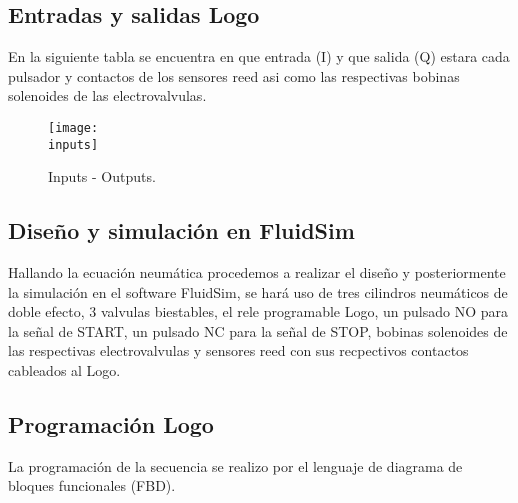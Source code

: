\documentclass[a4paper]{article}
\newcommand{\simulacion}{simulacion.pdf}
\newcommand{\program}{bloques.pdf}
\newcommand{\inputs}{images/io.png}
\begin{document}
\subsection{Entradas y salidas Logo}
En la siguiente tabla se encuentra en que entrada (I) y que salida (Q) estara cada pulsador y contactos de los sensores reed asi como las respectivas bobinas solenoides de las electrovalvulas.
\begin{figure}[h]
  \centering{}
  \texttt{[image: \\inputs]}
  \caption{Inputs - Outputs.}
\end{figure}

\subsection{Diseño y simulación en FluidSim}
Hallando la ecuación neumática procedemos a realizar el diseño y posteriormente la simulación en el software FluidSim, se hará uso de tres cilindros neumáticos de doble efecto, 3 valvulas biestables, el rele programable Logo, un pulsado NO para la señal de START, un pulsado NC para la señal de STOP, bobinas solenoides de las respectivas electrovalvulas y sensores reed con sus recpectivos contactos cableados al Logo.



\subsection{Programación Logo}
La programación de la secuencia se realizo por el lenguaje de diagrama de bloques funcionales (FBD).

\end{document}
